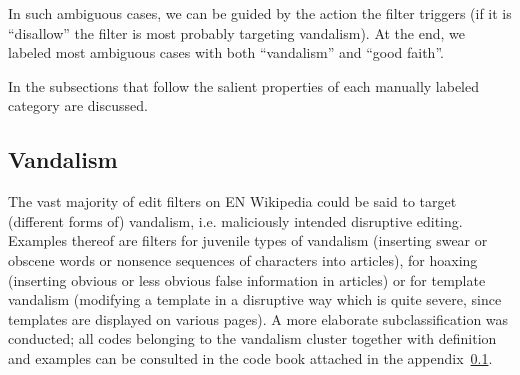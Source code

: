 In such ambiguous cases, we can be guided by the action the filter triggers (if it is ``disallow'' the filter is most probably targeting vandalism).
At the end, we labeled most ambiguous cases with both ``vandalism'' and ``good faith''.



In the subsections that follow the salient properties of each manually labeled category are discussed.

\subsection{Vandalism}

The vast majority of edit filters on EN Wikipedia could be said to target (different forms of) vandalism, i.e. maliciously intended disruptive editing.
Examples thereof are filters for juvenile types of vandalism (inserting swear or obscene words or nonsence sequences of characters into articles), for hoaxing (inserting obvious or less obvious false information in articles) or for template vandalism (modifying a template in a disruptive way which is quite severe, since templates are displayed on various pages).
A more elaborate subclassification was conducted; all codes belonging to the vandalism cluster together with definition and examples can be consulted in the code book attached in the appendix~\ref{}.

